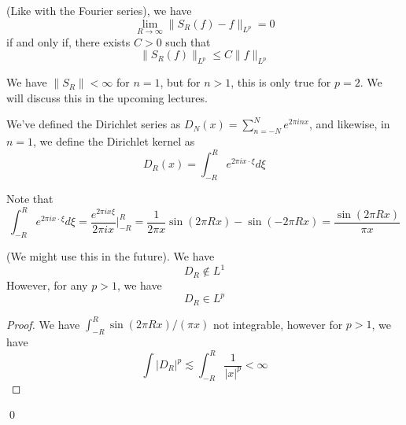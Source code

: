 \begin{proposition}
    (Like with the Fourier series), we have
    \begin{equation*}
        \lim_{R\to\infty}\|S_R(f)-f\|_{L^p}=0
    \end{equation*}
    if and only if, there exists $C>0$ such that
    \begin{equation*}
        \|S_R(f)\|_{L^p}\leq C\|f\|_{L^p}
    \end{equation*}
\end{proposition}
\begin{remark}
    We have $\|S_R\|<\infty$ for $n=1$, but for $n>1$, this is only true for $p=2$. We will discuss this in the upcoming lectures.
\end{remark}
\begin{definition}
    We've defined the Dirichlet series as $D_N(x)=\sum_{n=-N}^Ne^{2\pi inx}$, and likewise, in $n=1$, we define the Dirichlet kernel as
    \begin{equation*}
        D_R(x)=\int_{-R}^R e^{2\pi ix\cdot\xi}d\xi
    \end{equation*}
\end{definition}
Note that
\begin{equation*}
    \int_{-R}^Re^{2\pi ix\cdot\xi}d\xi=\frac{e^{2\pi ix\xi}}{2\pi ix}\rvert_{-R}^R=\frac{1}{2\pi x}\sin(2\pi Rx)-\sin(-2\pi Rx)=\frac{\sin(2\pi Rx)}{\pi x}
\end{equation*}
\begin{lemma}
    (We might use this in the future). We have
    \begin{equation*}
        D_R\not\in L^1
    \end{equation*}
    However, for any $p>1$, we have
    \begin{equation*}
        D_R\in L^p
    \end{equation*}
\end{lemma}
\begin{proof}
    We have $\int_{-R}^R \sin(2\pi Rx)/(\pi x)$ not integrable, however for $p>1$, we have
    \begin{equation*}
        \int |D_R|^p\lesssim\int_{-R}^R \frac{1}{|x|^p}<\infty
    \end{equation*}
\end{proof}
\qed

